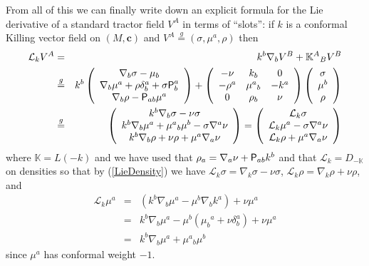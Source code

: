 \documentclass[a4paper,12pt]{amsart}
\newcommand{\V}{\mbox{\sf P}}
\newcommand{\cc}{\boldsymbol{c}}
\newcommand{\si}{\sigma}
\theoremstyle{remark}
\newcommand{\nn}[1]{(\ref{#1})}
\begin{document}
From all of this we can finally write down an explicit formula for the Lie derivative of a standard tractor field $V^A$ in terms of ``slots'': if  $k$ is a conformal Killing vector field on $(M,\cc)$ and $V^A \overset{g}{=} (\sigma, \mu^a, \rho)$ then
\begin{eqnarray*}
\mathcal{L}_k V^A &=& k^b \nabla_b V^B + \mathbb{K}^A{_B} V^B \\ &\overset{g}{=}&
k^b\left(\begin{array}{c} 
\nabla_b \si - \mu_b  \\
\nabla_b\mu^a +\rho\delta^a_b +\si\V^a_b \\ 
\nabla_b \rho - \V_{ab}\mu^a  \\
\end{array}\right) +
\left(\begin{array}{ccc} 
 -\nu   &  k_b      &   0  \\
-\rho^a & \mu^a{_b} & -k^a \\ 
   0    &  \rho_b   &  \nu \\
\end{array}\right) 
\left(\begin{array}{c} 
\si  \\
\mu^b  \\ 
\rho \\
\end{array}\right)\\
&\overset{g}{=}&
\left(\begin{array}{c} 
k^b\nabla_b \si - \nu\si  \\
k^b\nabla_b\mu^a + \mu^a{_b}\mu^b - \si \nabla^a\nu  \\ 
k^b\nabla_b \rho + \nu\rho + \mu^a\nabla_a\nu  \\
\end{array}\right)
=
\left(\begin{array}{c} 
\mathcal{L}_k \si  \\
\mathcal{L}_k \mu^a - \si \nabla^a\nu  \\ 
\mathcal{L}_k \rho + \mu^a\nabla_a\nu  \\
\end{array}\right)
\end{eqnarray*}
where $\mathbb{K}=L(-k)$ and we have used that $\rho_a = \nabla_a \nu + \V_{ab}k^b$ and that $\mathcal{L}_k=D_{-\mathbb{K}}$ on densities so that by \nn{LieDensity} we have $\mathcal{L}_k\si = \nabla_k \si - \nu\sigma$, $\mathcal{L}_k\rho = \nabla_k \rho + \nu\rho$, and
\begin{eqnarray*}
\mathcal{L}_k \mu^a &=& (k^b\nabla_b \mu^a - \mu^b \nabla_b k^a) + \nu\mu^a \\
&=& k^b\nabla_b\mu^a - \mu^b(\mu_b{^a}+\nu\delta_b^a) + \nu\mu^a \\
&=& k^b\nabla_b \mu^a + \mu^a{_b}\mu^b
\end{eqnarray*}
since $\mu^a$ has conformal weight $-1$. 
\end{document}
